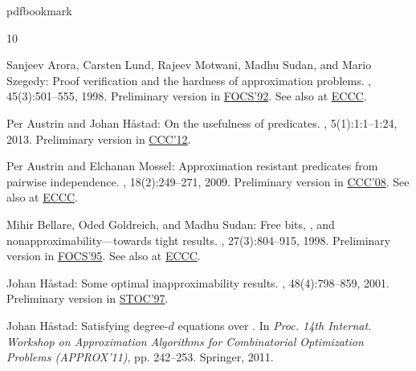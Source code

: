 %
%
%
%
%
\providecommand{\bibhead}[1]{}
%
\expandafter\ifx\csname pdfbookmark\endcsname\relax%
  \providecommand{\tocrefpdfbookmark}{}
\else\providecommand{\tocrefpdfbookmark}{%
   \hypertarget{tocreferences}{}%
   \pdfbookmark[1]{References}{tocreferences}}%
\fi

\tocrefpdfbookmark
\begin{thebibliography}{10}

\bibhead{almss}
{\sc Sanjeev Arora, Carsten Lund, Rajeev Motwani, Madhu Sudan, and Mario
  Szegedy}: Proof verification and the hardness of approximation problems.
, 45(3):501--555, 1998.
\newblock Preliminary version in
  \href{http://dx.doi.org/10.1109/SFCS.1992.267823}{FOCS'92}. See also at
  \href{http://eccc.hpi-web.de/report/1998/008/}{ECCC}.
\newblock [\epfmtdoi{10.1145/278298.278306}]

\bibhead{ah12}
{\sc Per Austrin and Johan H{\aa}stad}: On the usefulness of predicates.
, 5(1):1:1--1:24, 2013.
\newblock Preliminary version in
  \href{http://dx.doi.org/10.1109/CCC.2012.18}{CCC'12}.
\newblock [\epfmtdoi{10.1145/2462896.2462897}]

\bibhead{AustrinMossel:08}
{\sc Per Austrin and Elchanan Mossel}: Approximation resistant predicates from
  pairwise independence.
, 18(2):249--271, 2009.
\newblock Preliminary version in
  \href{http://dx.doi.org/10.1109/CCC.2008.20}{CCC'08}. See also at
  \href{http://eccc.hpi-web.de/report/2008/009/}{ECCC}.
\newblock [\epfmtdoi{10.1007/s00037-009-0272-6}]

\bibhead{bgs98}
{\sc Mihir Bellare, Oded Goldreich, and Madhu Sudan}: Free bits,
  , and nonapproximability---towards tight results.
, 27(3):804--915, 1998.
\newblock Preliminary version in
  \href{http://dx.doi.org/10.1109/SFCS.1995.492573}{FOCS'95}. See also at
  \href{http://eccc.hpi-web.de/report/1995/024/}{ECCC}.
\newblock [\epfmtdoi{10.1137/S0097539796302531}]

\bibhead{jhacm}
{\sc Johan H{\aa}stad}: Some optimal inapproximability results.
, 48(4):798--859, 2001.
\newblock Preliminary version in
  \href{http://dx.doi.org/10.1145/258533.258536}{STOC'97}.
\newblock [\epfmtdoi{10.1145/502090.502098}]

\bibhead{jhdegd}
{\sc Johan H{\aa}stad}: Satisfying degree-$d$ equations over
  .
\newblock In {\em Proc. 14th Internat. Workshop on Approximation Algorithms for
  Combinatorial Optimization Problems (APPROX'11)}, pp. 242--253. Springer,
  2011.
\newblock [\epfmtdoi{10.1007/978-3-642-22935-0\_21}]


\end{thebibliography}
